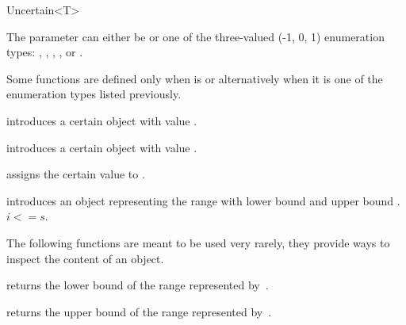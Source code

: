 \begin{ccRefClass}{Uncertain<T>}

  \ccParameters

  The parameter  can either be  or one of the three-valued
  (-1, 0, 1) enumeration types: , ,
  , ,  or .

  Some functions are defined only when  is  or alternatively
  when it is one of the enumeration types listed previously.


  \ccTypes
  \ccPropagateThreeToTwoColumns



  \ccCreation

  {introduces a certain object with value .}

  {introduces a certain object with value .}

  {assigns the certain value  to \ccVar.}

  {introduces an object representing the range with lower bound  and
  upper bound . \ccPrecond $ i<= s$. }


  The following functions are meant to be used very rarely, they provide ways to inspect
  the content of an  object.

  {returns the lower bound of the range represented by~\ccVar.}

  \ccGlue{}
  {returns the upper bound of the range represented by~\ccVar.}


\end{ccRefClass}
